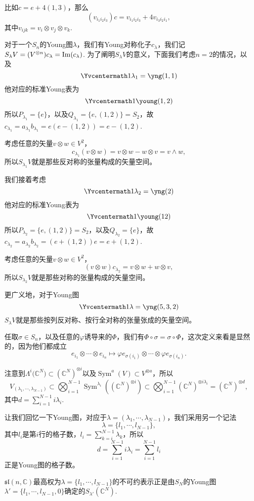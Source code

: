 \documentclass[9pt]{extarticle}
\newcommand{\cc}{\mathbb{C}}
\DeclareMathOperator{\sym}{Sym}
\begin{document}
比如$c=e+4(1,3)$，那么
\[
	(v_{i_1i_2i_3})c=v_{i_1i_2i_3}+4v_{i_3i_2i_1},
\]
其中$v_{ijk}=v_{i}\otimes v_{j}\otimes v_{k}$.

\para 对于一个$S_n$的Young图$\lambda$，我们有Young对称化子$c_\lambda$，我们记$S_\lambda V= (V^{\otimes n})c_\lambda=\operatorname{Im}(c_\lambda)$. 为了阐明$S_\lambda V$的意义，下面我们考虑$n=2$的情况，以及
\[\Yvcentermath1
	\lambda_1=\yng(1,1)
\]
他对应的标准Young表为
\[\Yvcentermath1
	\young(1,2)
\]
所以$P_{\lambda_1}=\{e\}$，以及$Q_{\lambda_1}=\{e,(1,2)\}=S_2$，故$c_{\lambda_1}=a_{\lambda_1} b_{\lambda_1} =e (e- (1,2))=e- (1,2)$.

考虑任意的矢量$v\otimes w\in V^2$，
\[
c_{\lambda_1}(v\otimes w)=v\otimes w-w\otimes v=v\wedge w,
\]
所以$S_{\lambda_1} V$就是那些反对称的张量构成的矢量空间。

我们接着考虑
\[\Yvcentermath1
	\lambda_2=\yng(2)
\]
他对应的标准Young表为
\[\Yvcentermath1
	\young(12)
\]
所以$P_{\lambda_2}=\{e,(1,2)\}=S_2$，以及$Q_{\lambda_2}=\{e\}$，故$c_{\lambda_2}=a_{\lambda_2} b_{\lambda_2} =(e+(1,2))e =e+(1,2)$.

考虑任意的矢量$v\otimes w\in V^2$，
\[
(v\otimes w)c_{\lambda_2}=v\otimes w+w\otimes v,
\]
所以$S_{\lambda_2} V$就是那些对称的张量构成的矢量空间。

更广义地，对于Young图
\[\Yvcentermath1
	\lambda=\yng(5,3,2)
\]
$S_{\lambda} V$就是那些按列反对称、按行全对称的张量张成的矢量空间。

\para 任取$\sigma\in S_n$，以及任意的$\varphi$诱导来的$\Phi$，我们有$\Phi\circ \sigma=\sigma\circ \Phi$，这次定义来看是显然的，因为他们都成立
\[
	e_{i_1}\otimes\cdots\otimes e_{i_n}\mapsto \varphi e_{\sigma(i_1)}\otimes\cdots\otimes \varphi e_{\sigma(i_n)}.
\]

\para 注意到$\Lambda^i\bigl(\cc^N\bigr)\subset (\cc^N)^{\otimes i}$以及$\sym^a(V)\subset V^{\otimes a}$，所以
\[
	V_{(\lambda_1,\cdots,\lambda_{N-1})}\subset \bigotimes_{i=1}^{N-1}\sym^{\lambda_i}\left((\cc^N)^{\otimes i}\right)\subset  \bigotimes_{i=1}^{N-1}(\cc^N)^{\otimes i\lambda_i}=(\cc^N)^{\otimes d},
\]
其中$d=\sum_{i=1}^{N-1}i\lambda_i$. 

让我们回忆一下Young图，对应于$\lambda=(\lambda_1,\cdots, \lambda_{N-1})$，我们采用另一个记法
\[
	\lambda=\{l_1,\cdots,l_{N-1}\},
\]
其中$l_i$是第$i$行的格子数，$l_i=\sum_{k=i}^{N-1}\lambda_k$，所以
\[
	d=\sum_{i=1}^{N-1}i\lambda_i=\sum_{i=1}^{N-1}l_i
\]
正是Young图的格子数。

\theo $\mathfrak{sl}(n,\cc)$最高权为$\lambda=\{l_1,\cdots,l_{N-1}\}$的不可约表示正是由$S_N$的Young图$\lambda'=\{l_1,\cdots,l_{N-1},0\}$确定的$S_{\lambda'} (\cc^N)$.
\end{document}
